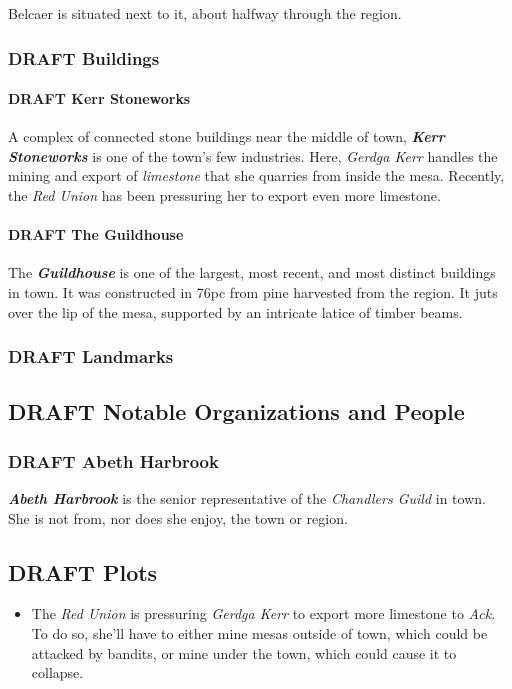 \documentclass[11pt]{teraum_reference_book}
\begin{document}
Belcaer is situated next to it, about halfway through the region.
\subsubsection*{{\bfseries\sffamily DRAFT} Buildings}
\label{sec:org6d2b907}
\paragraph{{\bfseries\sffamily DRAFT} Kerr Stoneworks}
\label{sec:org179e3ff}
A complex of connected stone buildings near the middle of town, \textbf{\emph{Kerr
Stoneworks}} is one of the town's few industries. Here, \emph{Gerdga Kerr}
handles the mining and export of \emph{limestone} that she quarries from
inside the mesa. Recently, the \emph{Red Union} has been pressuring her to
export even more limestone.
\paragraph{{\bfseries\sffamily DRAFT} The Guildhouse}
\label{sec:orgfaa06c5}
The \textbf{\emph{Guildhouse}} is one of the largest, most recent, and most
distinct buildings in town. It was constructed in 76pc from pine
harvested from the region. It juts over the lip of the mesa, supported
by an intricate latice of timber beams.
\subsubsection*{{\bfseries\sffamily DRAFT} Landmarks}
\label{sec:org169a340}
\subsection*{{\bfseries\sffamily DRAFT} Notable Organizations and People}
\label{sec:orgfc08c21}
\subsubsection*{{\bfseries\sffamily DRAFT} Abeth Harbrook}
\label{sec:orgb59bad2}
\textbf{\emph{Abeth Harbrook}} is the senior representative of the \emph{Chandlers
Guild} in town. She is not from, nor does she enjoy, the town or
region.
\subsection*{{\bfseries\sffamily DRAFT} Plots}
\label{sec:org0128942}
\begin{itemize}
\item The \emph{Red Union} is pressuring \emph{Gerdga Kerr} to export more limestone
to \emph{Ack}. To do so, she'll have to either mine mesas outside of
town, which could be attacked by bandits, or mine under the town,
which could cause it to collapse.
\end{itemize}
\end{document}
